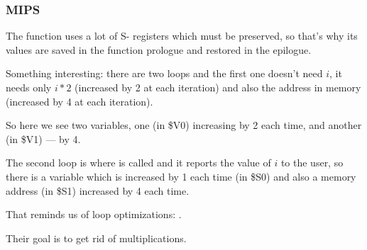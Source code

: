 ﻿\subsubsection{MIPS}

The function uses a lot of S- registers which must be preserved, so that's why its 
values are saved in the function prologue and restored in the epilogue.



Something interesting: there are two loops and the first one doesn't need $i$, it needs only 
$i*2$ (increased by 2 at each iteration) and also the address in memory (increased by 4 at each iteration).

So here we see two variables, one (in \$V0) increasing by 2 each time, and another (in \$V1) --- by 4.

The second loop is where \printf is called and it reports the value of $i$ to the user, 
so there is a variable
which is increased by 1 each time (in \$S0) and also a memory address (in \$S1) increased by 4 each time.

That reminds us of loop optimizations: .

Their goal is to get rid of multiplications.

